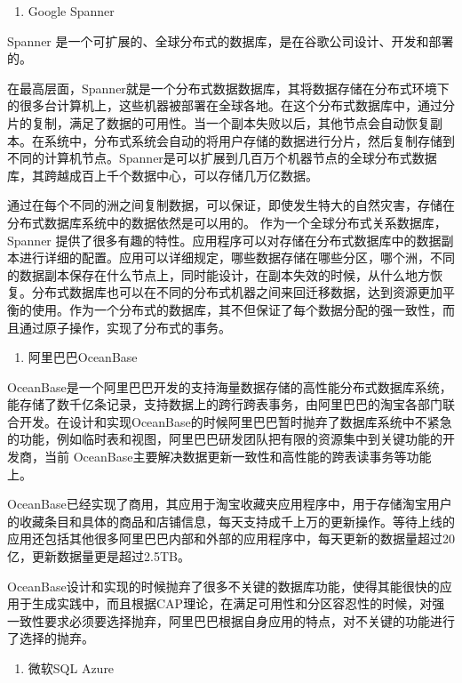 \begin{enumerate}
	\item Google Spanner
\end{enumerate}

	Spanner 是一个可扩展的、全球分布式的数据库，是在谷歌公司设计、开发和部署的。
	
	在最高层面，Spanner就是一个分布式数据数据库，其将数据存储在分布式环境下的很多台计算机上，这些机器被部署在全球各地。在这个分布式数据库中，通过分片的复制，满足了数据的可用性。当一个副本失败以后，其他节点会自动恢复副本。在系统中，分布式系统会自动的将用户存储的数据进行分片，然后复制存储到不同的计算机节点。Spanner是可以扩展到几百万个机器节点的全球分布式数据库，其跨越成百上千个数据中心，可以存储几万亿数据。
	
	通过在每个不同的洲之间复制数据，可以保证，即使发生特大的自然灾害，存储在分布式数据库系统中的数据依然是可以用的。
	作为一个全球分布式关系数据库，Spanner 提供了很多有趣的特性。应用程序可以对存储在分布式数据库中的数据副本进行详细的配置。应用可以详细规定，哪些数据存储在哪些分区，哪个洲，不同的数据副本保存在什么节点上，同时能设计，在副本失效的时候，从什么地方恢复。分布式数据库也可以在不同的分布式机器之间来回迁移数据，达到资源更加平衡的使用。作为一个分布式的数据库，其不但保证了每个数据分配的强一致性，而且通过原子操作，实现了分布式的事务。
	
	\begin{enumerate}[resume]
		\item 阿里巴巴OceanBase
	\end{enumerate}
	
	
	OceanBase是一个阿里巴巴开发的支持海量数据存储的高性能分布式数据库系统，能存储了数千亿条记录，支持数据上的跨行跨表事务，由阿里巴巴的淘宝各部门联合开发。在设计和实现OceanBase的时候阿里巴巴暂时抛弃了数据库系统中不紧急的功能，例如临时表和视图，阿里巴巴研发团队把有限的资源集中到关键功能的开发商，当前 OceanBase主要解决数据更新一致性和高性能的跨表读事务等功能上。
	
	OceanBase已经实现了商用，其应用于淘宝收藏夹应用程序中，用于存储淘宝用户的收藏条目和具体的商品和店铺信息，每天支持成千上万的更新操作。等待上线的应用还包括其他很多阿里巴巴内部和外部的应用程序中，每天更新的数据量超过20亿，更新数据量更是超过2.5TB。
	
	OceanBase设计和实现的时候抛弃了很多不关键的数据库功能，使得其能很快的应用于生成实践中，而且根据CAP理论，在满足可用性和分区容忍性的时候，对强一致性要求必须要选择抛弃，阿里巴巴根据自身应用的特点，对不关键的功能进行了选择的抛弃。
	\begin{enumerate}[resume]
		\item 微软SQL Azure
	\end{enumerate}
	
